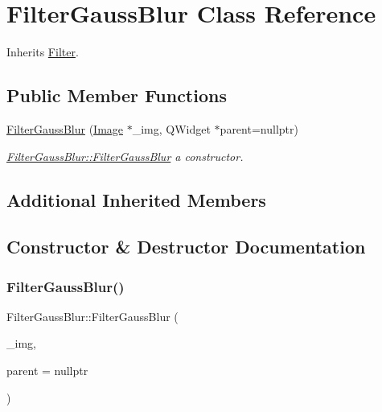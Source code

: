 \hypertarget{class_filter_gauss_blur}{}\section{Filter\+Gauss\+Blur Class Reference}
\label{class_filter_gauss_blur}


Inherits \mbox{\hyperlink{class_filter}{Filter}}.

\subsection*{Public Member Functions}
\begin{DoxyCompactItemize}
\item 
\mbox{\hyperlink{class_filter_gauss_blur_a0c68d0050dd01a12f41452fd11f9b5d4}{Filter\+Gauss\+Blur}} (\mbox{\hyperlink{class_image}{Image}} $\ast$\+\_\+img, Q\+Widget $\ast$parent=nullptr)
\begin{DoxyCompactList}\small\item\em \mbox{\hyperlink{class_filter_gauss_blur_a0c68d0050dd01a12f41452fd11f9b5d4}{Filter\+Gauss\+Blur\+::\+Filter\+Gauss\+Blur}} a constructor. \end{DoxyCompactList}\end{DoxyCompactItemize}
\subsection*{Additional Inherited Members}


\subsection{Constructor \& Destructor Documentation}
\mbox{\label{class_filter_gauss_blur_a0c68d0050dd01a12f41452fd11f9b5d4}} 
\subsubsection{\texorpdfstring{FilterGaussBlur()}{FilterGaussBlur()}}
{\footnotesize\ttfamily Filter\+Gauss\+Blur\+::\+Filter\+Gauss\+Blur (\begin{DoxyParamCaption}\item[{\mbox{\hyperlink{class_image}{Image}} $\ast$}]{\+\_\+img,  }\item[{Q\+Widget $\ast$}]{parent = {\ttfamily nullptr} }\end{DoxyParamCaption})}



